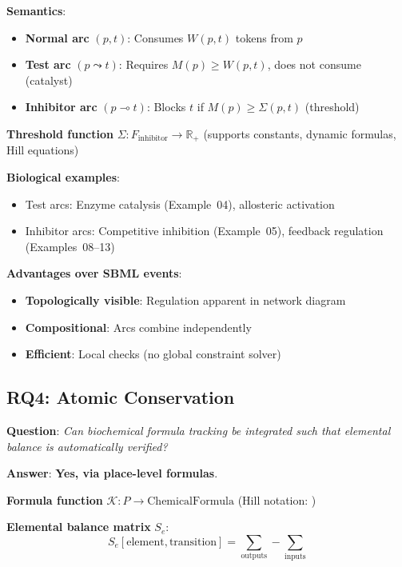 \textbf{Semantics}:
\begin{itemize}
    \item \textbf{Normal arc} $(p, t)$: Consumes $W(p,t)$ tokens from $p$
    \item \textbf{Test arc} $(p \leadsto t)$: Requires $M(p) \geq W(p,t)$, does not consume (catalyst)
    \item \textbf{Inhibitor arc} $(p \multimap t)$: Blocks $t$ if $M(p) \geq \Sigma(p,t)$ (threshold)
\end{itemize}

\textbf{Threshold function} $\Sigma: F_{\text{inhibitor}} \to \mathbb{R}_+$ (supports constants, dynamic formulas, Hill equations)

\textbf{Biological examples}:
\begin{itemize}
    \item Test arcs: Enzyme catalysis (Example~04), allosteric activation
    \item Inhibitor arcs: Competitive inhibition (Example~05), feedback regulation (Examples~08--13)
\end{itemize}

\textbf{Advantages over SBML events}:
\begin{itemize}
    \item \textbf{Topologically visible}: Regulation apparent in network diagram
    \item \textbf{Compositional}: Arcs combine independently
    \item \textbf{Efficient}: Local checks (no global constraint solver)
\end{itemize}

\subsection{RQ4: Atomic Conservation}
\label{subsec:rq4}

\textbf{Question}: \textit{Can biochemical formula tracking be integrated such that elemental balance is automatically verified?}

\textbf{Answer}: \textbf{Yes, via place-level formulas}.

\textbf{Formula function} $\mathcal{K}: P \to \text{ChemicalFormula}$ (Hill notation: )

\textbf{Elemental balance matrix} $S_e$:
\begin{equation}
S_e[\text{element}, \text{transition}] = \sum_{\text{outputs}} - \sum_{\text{inputs}}
\end{equation}

